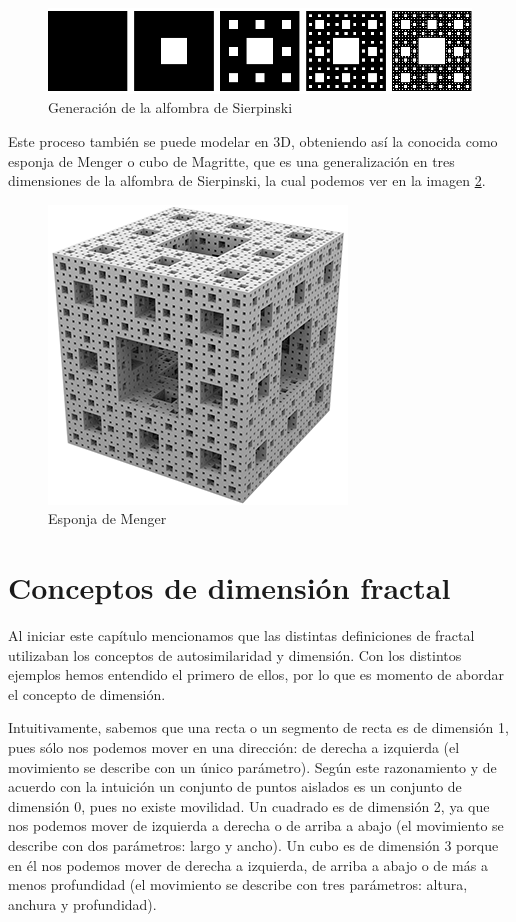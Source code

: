 \begin{figure} [h]
\centering
\includegraphics[scale = 0.6]{img/Sierpinski-carpet.png}
\caption{Generación de la alfombra de Sierpinski}
 \label{fig:alfombra-Sierpinski}
\end{figure}

Este proceso también se puede modelar en 3D, obteniendo así la conocida como esponja de Menger o cubo de Magritte, que es una generalización en tres dimensiones de la alfombra de Sierpinski, la cual podemos ver en la imagen \ref{fig:esponja-menger}.

\begin{figure} [h]
\centering
\includegraphics[scale = 0.6]{img/esponja_menger.png}
\caption{Esponja de Menger}
 \label{fig:esponja-menger}
\end{figure}

\section{Conceptos de dimensión fractal}
\label{section:dimension}

Al iniciar este capítulo mencionamos que las distintas definiciones de fractal utilizaban los conceptos de autosimilaridad y dimensión. Con los distintos ejemplos hemos entendido el primero de ellos, por lo que es momento de abordar el concepto de dimensión. 

Intuitivamente, sabemos que una recta o un segmento de recta es de dimensión 1, pues sólo nos podemos mover en una dirección: de derecha a izquierda (el movimiento se describe con un único parámetro). Según este razonamiento y de acuerdo con la intuición un conjunto de puntos aislados es un conjunto de dimensión 0, pues no existe movilidad. Un cuadrado es de dimensión 2, ya que nos podemos mover de izquierda a derecha o de arriba a abajo (el movimiento se describe con dos parámetros: largo y ancho). Un cubo es de dimensión 3 porque en él nos podemos mover de derecha a izquierda, de arriba a abajo o de más a menos profundidad (el movimiento se describe con tres parámetros: altura, anchura y profundidad). 

